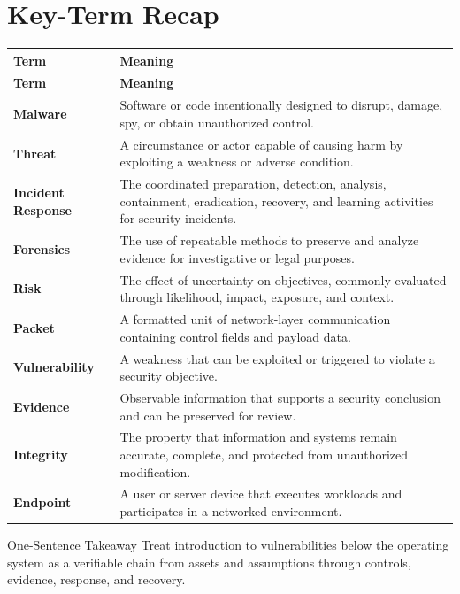 \documentclass[11pt,letterpaper]{article}
\begin{document}
\section*{Key-Term Recap}
\begin{longtable}{>{\raggedright\arraybackslash}p{}>{\raggedright\arraybackslash}p{}}
\toprule\rowcolor{Navy}\color{white}\textbf{Term} & \color{white}\textbf{Meaning}\\\midrule
\endfirsthead
\toprule\rowcolor{Navy}\color{white}\textbf{Term} & \color{white}\textbf{Meaning}\\\midrule
\endhead
\textbf{Malware} & Software or code intentionally designed to disrupt, damage, spy, or obtain unauthorized control. \\\midrule
\textbf{Threat} & A circumstance or actor capable of causing harm by exploiting a weakness or adverse condition. \\\midrule
\textbf{Incident Response} & The coordinated preparation, detection, analysis, containment, eradication, recovery, and learning activities for security incidents. \\\midrule
\textbf{Forensics} & The use of repeatable methods to preserve and analyze evidence for investigative or legal purposes. \\\midrule
\textbf{Risk} & The effect of uncertainty on objectives, commonly evaluated through likelihood, impact, exposure, and context. \\\midrule
\textbf{Packet} & A formatted unit of network-layer communication containing control fields and payload data. \\\midrule
\textbf{Vulnerability} & A weakness that can be exploited or triggered to violate a security objective. \\\midrule
\textbf{Evidence} & Observable information that supports a security conclusion and can be preserved for review. \\\midrule
\textbf{Integrity} & The property that information and systems remain accurate, complete, and protected from unauthorized modification. \\\midrule
\textbf{Endpoint} & A user or server device that executes workloads and participates in a networked environment. \\\midrule
\bottomrule
\end{longtable}
\begin{CornellExamBox}{One-Sentence Takeaway}
Treat introduction to vulnerabilities below the operating system as a verifiable chain from assets and assumptions through controls, evidence, response, and recovery.
\end{CornellExamBox}
\end{document}
